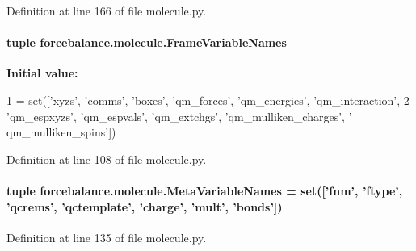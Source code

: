 Definition at line 166 of file molecule.\-py.

\hypertarget{namespaceforcebalance_1_1molecule_a0044fa397e0923635a8b3e9625aa70f7}{
\paragraph[{Frame\-Variable\-Names}]{\setlength{\rightskip}{0pt plus 5cm}tuple forcebalance.\-molecule.\-Frame\-Variable\-Names}}\label{namespaceforcebalance_1_1molecule_a0044fa397e0923635a8b3e9625aa70f7}
{\bfseries Initial value\-:}
\begin{DoxyCode}
1 = set([\textcolor{stringliteral}{'xyzs'}, \textcolor{stringliteral}{'comms'}, \textcolor{stringliteral}{'boxes'}, \textcolor{stringliteral}{'qm\_forces'}, \textcolor{stringliteral}{'qm\_energies'}, \textcolor{stringliteral}{'qm\_interaction'}, 
2                           \textcolor{stringliteral}{'qm\_espxyzs'}, \textcolor{stringliteral}{'qm\_espvals'}, \textcolor{stringliteral}{'qm\_extchgs'}, \textcolor{stringliteral}{'qm\_mulliken\_charges'}, \textcolor{stringliteral}{'
      qm\_mulliken\_spins'}])
\end{DoxyCode}


Definition at line 108 of file molecule.\-py.

\hypertarget{namespaceforcebalance_1_1molecule_a38e1c99e9567fe42b792af43db9b7488}{
\paragraph[{Meta\-Variable\-Names}]{\setlength{\rightskip}{0pt plus 5cm}tuple forcebalance.\-molecule.\-Meta\-Variable\-Names = set(\mbox{[}'fnm', 'ftype', 'qcrems', 'qctemplate', 'charge', 'mult', 'bonds'\mbox{]})}}\label{namespaceforcebalance_1_1molecule_a38e1c99e9567fe42b792af43db9b7488}


Definition at line 135 of file molecule.\-py.

